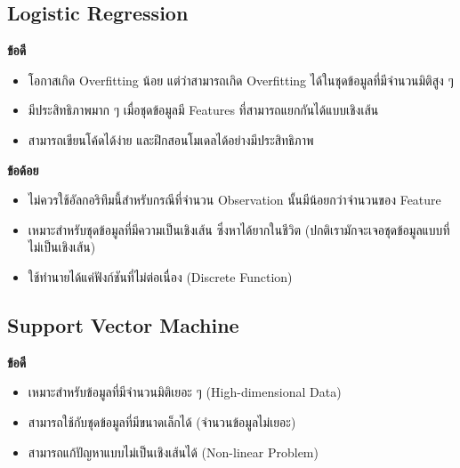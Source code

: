 \subsection{Logistic Regression}
\label{ssec:pros_cons_log_reg}

\noindent \textbf{ข้อดี}
\begin{itemize}[topsep=0pt]
    \item โอกาสเกิด Overfitting น้อย แต่ว่าสามารถเกิด Overfitting ได้ในชุดข้อมูลที่มีจำนวนมิติสูง ๆ
    
    \item มีประสิทธิภาพมาก ๆ เมื่อชุดข้อมูลมี Features ที่สามารถแยกกันได้แบบเชิงเส้น
    
    \item สามารถเขียนโค้ดได้ง่าย และฝึกสอนโมเดลได้อย่างมีประสิทธิภาพ
\end{itemize}

\noindent \textbf{ข้อด้อย}
\begin{itemize}[topsep=0pt]
    \item ไม่ควรใช้อัลกอริทึมนี้สำหรับกรณีที่จำนวน Observation นั้นมีน้อยกว่าจำนวนของ Feature

    \item เหมาะสำหรับชุดข้อมูลที่มีความเป็นเชิงเส้น ซึ่งหาได้ยากในชีวิต (ปกติเรามักจะเจอชุดข้อมูลแบบที่ไม่เป็นเชิงเส้น)
    
    \item ใช้ทำนายได้แค่ฟังก์ชันที่ไม่ต่อเนื่อง (Discrete Function)
\end{itemize}

\subsection{Support Vector Machine}
\label{ssec:pros_cons_svm}

\noindent \textbf{ข้อดี}
\begin{itemize}[topsep=0pt]
    \item เหมาะสำหรับข้อมูลที่มีจำนวนมิติเยอะ ๆ (High-dimensional Data)
    
    \item สามารถใช้กับชุดข้อมูลที่มีขนาดเล็กได้ (จำนวนข้อมูลไม่เยอะ)
    
    \item สามารถแก้ปัญหาแบบไม่เป็นเชิงเส้นได้ (Non-linear Problem)
\end{itemize}


